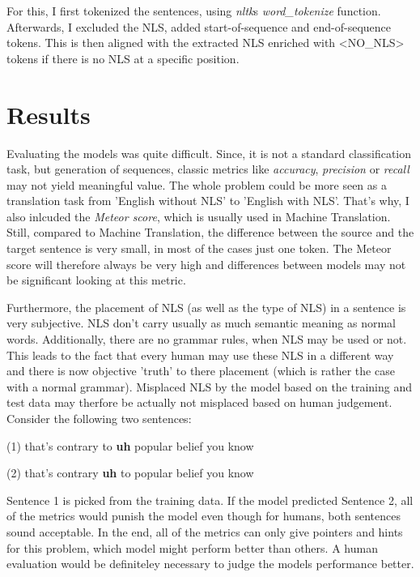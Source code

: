 \documentclass[
	11pt, %
]{fphw}
\begin{document}
For this, I first tokenized the sentences, using \emph{nltk}s \emph{word\_tokenize} function. Afterwards, I excluded the NLS, added start-of-sequence and end-of-sequence tokens. This is then aligned with the extracted NLS enriched with <NO\_NLS> tokens if there is no NLS at a specific position.

\section*{Results}
Evaluating the models was quite difficult. Since, it is not a standard classification task, but generation of sequences, classic metrics like \emph{accuracy}, \emph{precision} or \emph{recall} may not yield meaningful value. The whole problem could be more seen as a translation task from 'English without NLS' to 'English with NLS'. That's why, I also inlcuded the \emph{Meteor score}, which is usually used in Machine Translation. Still, compared to Machine Translation, the difference between the source and the target sentence is very small, in most of the cases just one token. The Meteor score will therefore always be very high and differences between models may not be significant looking at this metric.

Furthermore, the placement of NLS (as well as the type of NLS) in a sentence is very subjective. NLS don't carry usually as much semantic meaning as normal words. Additionally, there are no grammar rules, when NLS may be used or not. This leads to the fact that every human may use these NLS in a different way and there is now objective 'truth' to there placement (which is rather the case with a normal grammar). Misplaced NLS by the model based on the training and test data may therfore be actually not misplaced based on human judgement. Consider the following two sentences:
\begin{center}
    (1) that's contrary to \textbf{uh} popular belief you know
\end{center}
\begin{center}
    (2) that's contrary \textbf{uh} to popular belief you know
\end{center}
Sentence 1 is picked from the training data. If the model predicted Sentence 2, all of the metrics would punish the model even though for humans, both sentences sound acceptable. In the end, all of the metrics can only give pointers and hints for this problem, which model might perform better than others. A human evaluation would be definiteley necessary to judge the models performance better.
\end{document}
